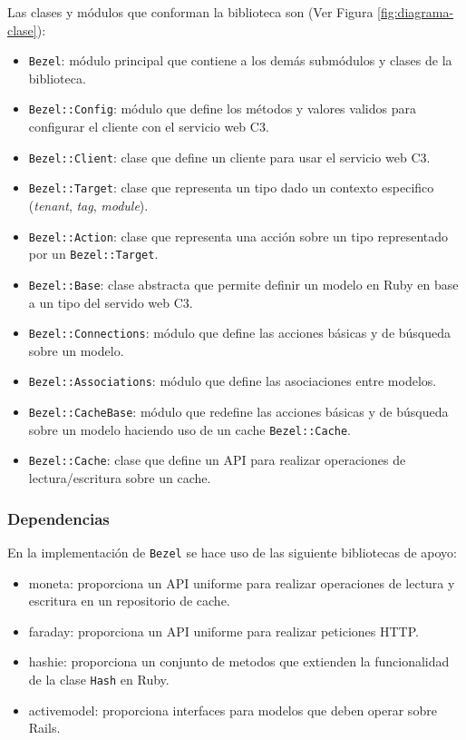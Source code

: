 Las clases y módulos que conforman la biblioteca son
(Ver Figura \ref{fig:diagrama-clase}):
\begin{itemize}
\item \texttt{Bezel}: módulo principal que contiene a los demás submódulos y
  clases de la biblioteca.
\item \texttt{Bezel::Config}: módulo que define los métodos y valores validos
  para configurar el cliente con el servicio web C3.
\item \texttt{Bezel::Client}: clase que define un cliente para usar el servicio
  web C3.
\item \texttt{Bezel::Target}: clase que representa un tipo dado un contexto
  especifico (\textit{tenant}, \textit{tag}, \textit{module}).
\item \texttt{Bezel::Action}: clase que representa una acción sobre
  un tipo representado por un \texttt{Bezel::Target}.
\item \texttt{Bezel::Base}: clase abstracta que permite definir un modelo en Ruby
  en base a un tipo del servido web C3.
\item \texttt{Bezel::Connections}: módulo que define las acciones básicas y de
  búsqueda sobre un modelo.
\item \texttt{Bezel::Associations}: módulo que define las asociaciones entre
  modelos.
\item \texttt{Bezel::CacheBase}: módulo que redefine las acciones básicas y
  de búsqueda sobre un modelo haciendo uso de un cache \texttt{Bezel::Cache}.
\item \texttt{Bezel::Cache}: clase que define un API para realizar operaciones
  de lectura/escritura sobre un cache.
\end{itemize}


\subsubsection{Dependencias}

En la implementación de \texttt{Bezel} se hace uso de las siguiente bibliotecas
de apoyo:

\begin{itemize}
\item moneta: proporciona un API uniforme para realizar
  operaciones de lectura y escritura en un repositorio de cache.
\item faraday: proporciona un API uniforme para realizar
  peticiones HTTP.
\item hashie: proporciona un conjunto de metodos que extienden la funcionalidad
  de la clase \texttt{Hash} en Ruby.
\item activemodel: proporciona interfaces para modelos que deben operar sobre
  Rails.
\end{itemize}

